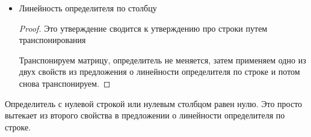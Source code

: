\begin{theorem-non}
\begin{itemize}
\begin{enumerate}
            $B = \begin{pmatrix}
                a_{11} & \dots & a_{1n} \\
                \dots & \dots & \dots \\
                \lambda a_{k1} & \dots & \lambda a_{kn} \\
                \dots & \dots & \dots \\
                a_{n1} & \dots & a_{nn}
            \end{pmatrix} \Longrightarrow \abs{B} = \lambda \abs{A}$ 
            \begin{proof}
                $\abs{B} = \sum\limits_{\sigma} sgn \ \sigma \cdot a_{1, \sigma(1)} \dots 
                \lambda a_{k, \sigma(k)} \dots a_{n, \sigma(n)} = \lambda \abs{A}$, так как $\lambda$ можно сразу вынести
            \end{proof}
        \end{enumerate}
        \item[] Линейность определителя по столбцу 
        \begin{proof}
            Это утверждение сводится к утверждению про строки путем транспонирования

            Транспонируем матрицу, определитель не меняется, затем применяем одно из двух свойств из 
            предложения о линейности определителя по строке и потом снова транспонируем.
        \end{proof} 
    \end{itemize}
\end{theorem-non}

\follow \; Определитель с нулевой строкой или нулевым столбцом равен нулю. Это просто вытекает из второго свойства в предложении 
о линейности определителя по строке.